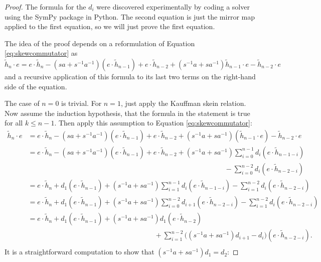 \begin{proof}
The formula for the $d_i$ were discovered experimentally by coding a solver using the SymPy package in Python. The second equation is just the mirror map applied to the first equation, so we will just prove the first equation.

The idea of the proof depends on a reformulation of Equation \eqref{eq:skewcommutator} as
\[
\tilde{h}_n \cdot e = e \cdot \tilde{h}_n - ( s a + s^{-1} a^{-1} ) ( e \cdot \tilde{h}_{n-1} ) + e \cdot \tilde{h}_{n-2} + ( s^{-1} a + s a^{-1} ) \tilde{h}_{n-1} \cdot e - \tilde{h}_{n-2} \cdot e
\]
and a recursive application of this formula to its last two terms on the right-hand side of the equation. 

The case of $n=0$ is trivial. For $n=1$, just apply the Kauffman skein relation. Now assume the induction hypothesis, that the formula in the statement is true for all $k \leq n-1$. Then apply this assumption to Equation \eqref{eq:skewcommutator}:
\begin{align*}
\tilde{h}_n \cdot e &= e \cdot \tilde{h}_n - ( s a + s^{-1} a^{-1} ) ( e \cdot \tilde{h}_{n-1} ) + e \cdot \tilde{h}_{n-2} + ( s^{-1} a + s a^{-1} ) ( \tilde{h}_{n-1} \cdot e ) - \tilde{h}_{n-2} \cdot e \\
&= e \cdot \tilde{h}_n - ( s a + s^{-1} a^{-1} ) ( e \cdot \tilde{h}_{n-1} ) + e \cdot \tilde{h}_{n-2} + ( s^{-1} a + s a^{-1} ) \sum_{i=0}^{n-1} d_i (e \cdot \tilde{h}_{n-1-i}) \\
&\qquad\qquad\qquad\qquad\qquad\qquad\qquad\qquad\qquad\qquad\qquad\qquad\qquad\qquad - \sum_{i=0}^{n-2} d_i (e \cdot \tilde{h}_{n-2-i}) \\
&= e \cdot \tilde{h}_n + d_1 ( e \cdot \tilde{h}_{n-1} ) + ( s^{-1} a + s a^{-1} ) \sum_{i=1}^{n-1} d_i (e \cdot \tilde{h}_{n-1-i}) - \sum_{i=1}^{n-2} d_i (e \cdot \tilde{h}_{n-2-i}) \\
&= e \cdot \tilde{h}_n + d_1 ( e \cdot \tilde{h}_{n-1} ) + ( s^{-1} a + s a^{-1} ) \sum_{i=0}^{n-2} d_{i+1} (e \cdot \tilde{h}_{n-2-i}) - \sum_{i=1}^{n-2} d_i (e \cdot \tilde{h}_{n-2-i}) \\
&= e \cdot \tilde{h}_n + d_1 ( e \cdot \tilde{h}_{n-1} ) + ( s^{-1} a + s a^{-1} ) d_1 ( e \cdot \tilde{h}_{n-2} ) \\
&\qquad\qquad\qquad\qquad\qquad\qquad\qquad\qquad\quad\quad+ \sum_{i=1}^{n-2} \big( ( s^{-1} a + s a^{-1} ) d_{i+1} - d_i \big) (e \cdot \tilde{h}_{n-2-i}). \\
\end{align*}
It is a straightforward computation to show that $( s^{-1} a + s a^{-1} ) d_1 = d_2$:

\end{proof}
